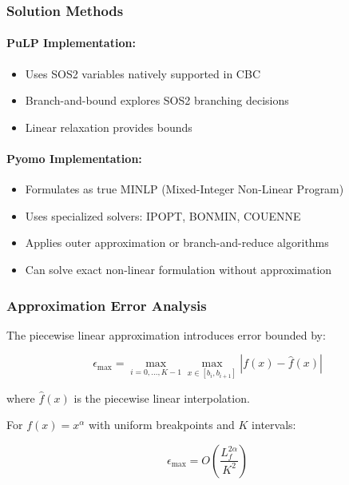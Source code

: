 \documentclass[11pt,a4paper]{article}
\begin{document}
\subsubsection{Solution Methods}

\paragraph{PuLP Implementation:}
\begin{itemize}
    \item Uses SOS2 variables natively supported in CBC
    \item Branch-and-bound explores SOS2 branching decisions
    \item Linear relaxation provides bounds
\end{itemize}

\paragraph{Pyomo Implementation:}
\begin{itemize}
    \item Formulates as true MINLP (Mixed-Integer Non-Linear Program)
    \item Uses specialized solvers: IPOPT, BONMIN, COUENNE
    \item Applies outer approximation or branch-and-reduce algorithms
    \item Can solve exact non-linear formulation without approximation
\end{itemize}

\subsubsection{Approximation Error Analysis}

The piecewise linear approximation introduces error bounded by:

\begin{equation}
\epsilon_{\max} = \max_{i=0,\ldots,K-1} \max_{x \in [b_i, b_{i+1}]} |f(x) - \hat{f}(x)|
\end{equation}

where $\hat{f}(x)$ is the piecewise linear interpolation.

For $f(x) = x^\alpha$ with uniform breakpoints and $K$ intervals:

\begin{equation}
\epsilon_{\max} = O\left(\frac{L_f^{2\alpha}}{K^2}\right)
\end{equation}
\end{document}
